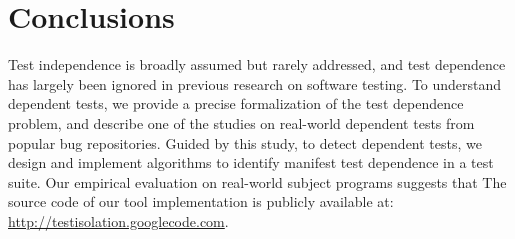 \section{Conclusions}
\label{sec:questions}

Test independence is broadly assumed but rarely addressed, and
test dependence has largely been ignored in previous
research on software testing. To understand
dependent tests, we provide a
precise formalization of the test dependence problem,
and describe one of the studies on real-world dependent
tests from popular bug repositories. Guided by
this study, to detect dependent tests, we design
and implement  algorithms to identify manifest test dependence
in a test suite. Our empirical evaluation on 
real-world subject programs suggests that 
The source code of our tool implementation is publicly
available at: \url{http://testisolation.googlecode.com}.
